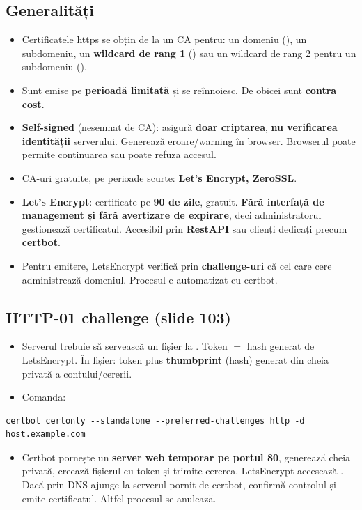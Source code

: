 \documentclass[11pt,a4paper]{article}
\begin{document}
\subsection*{Generalități}
\begin{itemize}
  \item Certificatele https se obțin de la un CA pentru: un domeniu (), un subdomeniu, un \textbf{wildcard de rang 1} () sau un wildcard de rang 2 pentru un subdomeniu ().
  \item Sunt emise pe \textbf{perioadă limitată} și se reînnoiesc. De obicei sunt \textbf{contra cost}.
  \item \textbf{Self-signed} (nesemnat de CA): asigură \textbf{doar criptarea}, \textbf{nu verificarea identității} serverului. Generează eroare/warning în browser. Browserul poate permite continuarea sau poate refuza accesul.
  \item CA-uri gratuite, pe perioade scurte: \textbf{Let's Encrypt, ZeroSSL}.
  \item \textbf{Let's Encrypt}: certificate pe \textbf{90 de zile}, gratuit. \textbf{Fără interfață de management și fără avertizare de expirare}, deci administratorul gestionează certificatul. Accesibil prin \textbf{RestAPI} sau clienți dedicați precum \textbf{certbot}.
  \item Pentru emitere, LetsEncrypt verifică prin \textbf{challenge-uri} că cel care cere administrează domeniul. Procesul e automatizat cu certbot.
\end{itemize}

\subsection*{HTTP-01 challenge (slide 103)}
\begin{itemize}
  \item Serverul trebuie să servească un fișier la . Token $=$ hash generat de LetsEncrypt. În fișier: token plus \textbf{thumbprint} (hash) generat din cheia privată a contului/cererii.
  \item Comanda:
\end{itemize}
\begin{lstlisting}
certbot certonly --standalone --preferred-challenges http -d host.example.com
\end{lstlisting}
\begin{itemize}
  \item Certbot pornește un \textbf{server web temporar pe portul 80}, generează cheia privată, creează fișierul cu token și trimite cererea. LetsEncrypt accesează . Dacă prin DNS ajunge la serverul pornit de certbot, confirmă controlul și emite certificatul. Altfel procesul se anulează.
\end{itemize}
\end{document}
